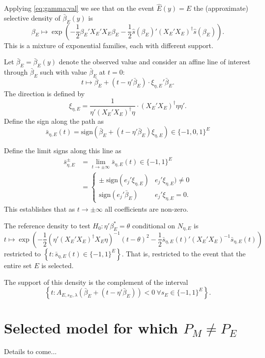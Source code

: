 \documentclass{article}
\newcommand{\OLS}{\bar{\beta}}
\begin{document}
        Applying \eqref{eq:gamma:val} we see that on
        the event $\hat{E}(y)=E$ the (approximate) selective density of
        $\OLS_E(y)$ is
        \begin{equation}
          \label{eq:proposal}
          \beta_E \mapsto \exp\left(-\frac{1}{2} \beta_E'X_E'X_E\beta_E - \frac{1}{2}\hat{s}(\beta_E)'(X_E'X_E)^{\dagger}\hat{s}(\beta_E)\right).
          \end{equation}
        This is a mixture of exponential families, each with different support. 

        Let $\OLS_E=\OLS_E(y)$ denote the observed value and consider an affine line of interest through
        $\OLS_E$ such with value $\OLS_E$ at $t=0$:
        $$t \mapsto \OLS_E + (t- \eta'\OLS_E) \cdot \xi_{\eta,E}' \OLS_E.$$
        The direction is defined by $$
        \xi_{\eta,E} = \frac{1}{\eta'(X_E'X_E)^{\dagger}\eta} \cdot (X_E'X_E)^{\dagger} \eta \eta'.
        $$ 
        Define the sign along the path as
        $$
        \bar{s}_{\eta,E}(t) = \textrm{sign}\left( \OLS_E + (t - \eta'\OLS_E) \xi_{\eta,E} \right)
        \in \{-1,0,1\}^E
        $$

        Define the limit signs along this line as
        $$
        \begin{aligned}
          \bar{s}^{\pm}_{\eta, E} &= \lim_{t \to \pm \infty} \bar{s}_{\eta, E}(t)  \in \{-1,1\}^E \\
          &= \begin{cases}
            \pm \; \text{sign} (e_j'\xi_{\eta,E}) & e_j'\xi_{\eta,E}) \neq 0 \\
            \text{sign}(e_j'\OLS_{E}) & e_j'\xi_{\eta,E}=0.
            \end{cases}
        \end{aligned}
        $$
        This establishes that as $t \to \pm \infty$ all coefficients are non-zero.

        The reference density to test $H_0:\eta'\beta_E^*=\theta$
        conditional on $N_{\eta, E}$ is 
        $$
        t \mapsto
        \exp\left(-\frac{1}{2}\left(\eta'(X_E'X_E)^{\dagger}X_E\eta\right)^{-1}(t-\theta)^2 - \frac{1}{2} \bar{s}_{\eta,E}(t)' (X_E'X_E)^{-1} \bar{s}_{\eta,E}(t)\right)
        $$
        restricted to $\left\{t: \bar{s}_{\eta,E}(t) \in \{-1,1\}^E\right\}$. That is,
        restricted to the event that the entire set $E$ is selected.

        The support of this density is the complement of the interval
        $$
        \left\{t: A_{E,s_E,\lambda}(\OLS_E + (t - \eta'\OLS_E)) < 0 \ \forall s_E \in \{-1,1\}^E \right\}.
        $$
        
        \section{Selected model for which $P_M \neq P_E$}

        Details to come...
\end{document}
